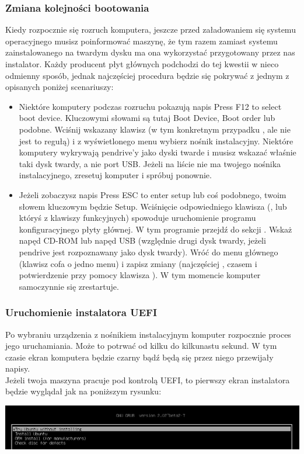 \subsubsection{Zmiana kolejności bootowania}
Kiedy rozpocznie się rozruch komputera, jeszcze przed załadowaniem się systemu operacyjnego musisz poinformować maszynę, że tym razem zamiast systemu zainstalowanego na twardym dysku ma ona wykorzystać przygotowany przez nas instalator. Każdy producent płyt głównych podchodzi do tej kwestii w nieco odmienny sposób, jednak najczęściej procedura będzie się pokrywać z jednym z opisanych poniżej scenariuszy:
\begin{itemize}
\item Niektóre komputery podczas rozruchu pokazują napis \textcolor{ubuntu_orange}{Press F12 to select boot device}. Kluczowymi słowami są tutaj \textcolor{ubuntu_orange}{Boot Device}, \textcolor{ubuntu_orange}{Boot order} lub podobne. Wciśnij wskazany klawisz (w tym konkretnym przypadku , ale nie jest to regułą) i z wyświetlonego menu wybierz nośnik instalacyjny. Niektóre komputery wykrywają pendrive'y jako dyski twarde i musisz wskazać właśnie taki dysk twardy, a nie port USB. Jeżeli na liście nie ma twojego nośnika instalacyjnego, zresetuj komputer i spróbuj ponownie.
\item Jeżeli zobaczysz napis \textcolor{ubuntu_orange}{Press ESC to enter setup} lub coś podobnego, twoim słowem kluczowym będzie \textcolor{ubuntu_orange}{Setup}. Wciśnięcie odpowiedniego klawisza (\keys{\escwin}, \keys{\delwin} lub któryś z klawiszy funkcyjnych) spowoduje uruchomienie programu konfiguracyjnego płyty głównej. W tym programie przejdź do sekcji . Wskaż napęd CD-ROM lub napęd USB (względnie drugi dysk twardy, jeżeli pendrive jest rozpoznawany jako dysk twardy). Wróć do menu głównego (klawisz \keys{\escwin} cofa o jedno menu) i zapisz zmiany (najczęściej , czasem \keys{\escwin} i potwierdzenie przy pomocy klawisza ). W tym momencie komputer samoczynnie się zrestartuje.
\end{itemize}
\subsubsection{Uruchomienie instalatora UEFI}
\label{instalacja_uruchomienie_uefi}
Po wybraniu urządzenia z nośnikiem instalacyjnym komputer rozpocznie proces jego uruchamiania. Może to potrwać od kilku do kilkunastu sekund. W tym czasie ekran komputera będzie czarny bądź będą się przez niego przewijały napisy.\\
Jeżeli twoja maszyna pracuje pod kontrolą UEFI, to pierwszy ekran instalatora będzie wyglądał jak na poniższym rysunku:
\begin{center}
        \includegraphics[width=\linewidth]{images/instalacja_UEFI_boot.png}
\end{center}

